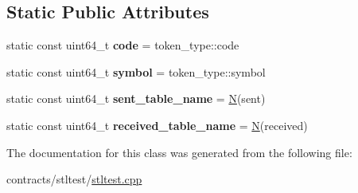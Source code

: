 \subsection*{Static Public Attributes}
\begin{DoxyCompactItemize}
\item 
\mbox{\label{classstltest_1_1contract_a6462ca0af512b4d9d86e7e723fbcdcd9}} 
static const uint64\+\_\+t {\bfseries code} = token\+\_\+type\+::code
\item 
\mbox{\label{classstltest_1_1contract_a4ec761c0097df8e535299bef84b86c9f}} 
static const uint64\+\_\+t {\bfseries symbol} = token\+\_\+type\+::symbol
\item 
\mbox{\label{classstltest_1_1contract_a1128011374237900122026d846ec83b9}} 
static const uint64\+\_\+t {\bfseries sent\+\_\+table\+\_\+name} = \mbox{\hyperlink{group__types_gaf9c1edb0e0da55ec6ba09f32f6839529}{N}}(sent)
\item 
\mbox{\label{classstltest_1_1contract_ad183ee3ede5e7f6bdd6a506855d4b506}} 
static const uint64\+\_\+t {\bfseries received\+\_\+table\+\_\+name} = \mbox{\hyperlink{group__types_gaf9c1edb0e0da55ec6ba09f32f6839529}{N}}(received)
\end{DoxyCompactItemize}


The documentation for this class was generated from the following file\+:\begin{DoxyCompactItemize}
\item 
contracts/stltest/\mbox{\hyperlink{stltest_8cpp}{stltest.\+cpp}}\end{DoxyCompactItemize}
